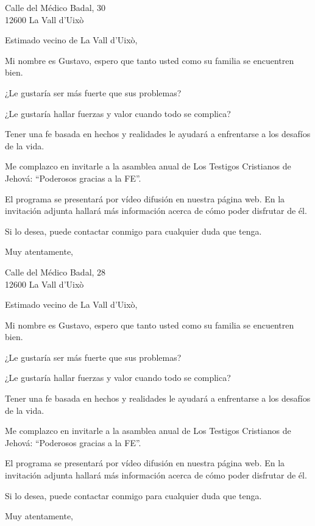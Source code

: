 \documentclass{scrlttr2}
\begin{document}
\begin{letter}{%
Calle del Médico Badal, 30\\
12600 La Vall d'Uixò\\
}
\opening{Estimado vecino de La Vall d'Uixò,}

Mi nombre es Gustavo, espero que tanto usted como su familia se encuentren bien.

¿Le gustaría ser más fuerte que sus problemas?

¿Le gustaría hallar fuerzas y valor cuando todo se complica?

Tener una fe basada en hechos y realidades le ayudará a enfrentarse a los desafíos de la vida.

Me complazco en invitarle a la asamblea anual de Los Testigos Cristianos de Jehová: ``Poderosos gracias a la FE''.

El programa se presentará por vídeo difusión en nuestra página web. En la invitación adjunta hallará más información acerca de cómo poder disfrutar de él.

Si lo desea, puede contactar conmigo para cualquier duda que tenga.

\closing{Muy atentamente,}


\end{letter}
\begin{letter}{%
Calle del Médico Badal, 28\\
12600 La Vall d'Uixò\\
}
\opening{Estimado vecino de La Vall d'Uixò,}

Mi nombre es Gustavo, espero que tanto usted como su familia se encuentren bien.

¿Le gustaría ser más fuerte que sus problemas?

¿Le gustaría hallar fuerzas y valor cuando todo se complica?

Tener una fe basada en hechos y realidades le ayudará a enfrentarse a los desafíos de la vida.

Me complazco en invitarle a la asamblea anual de Los Testigos Cristianos de Jehová: ``Poderosos gracias a la FE''.

El programa se presentará por vídeo difusión en nuestra página web. En la invitación adjunta hallará más información acerca de cómo poder disfrutar de él.

Si lo desea, puede contactar conmigo para cualquier duda que tenga.

\closing{Muy atentamente,}


\end{letter}
\end{document}
